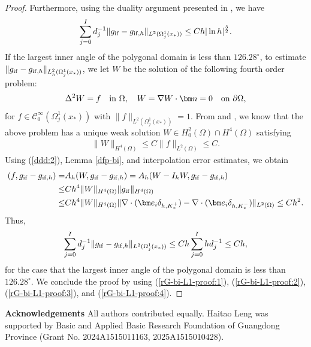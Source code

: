 \documentclass[1996/10/24]{amsart}
\theoremstyle{definition}
\numberwithin{equation}{section}
\begin{document}
\begin{proof}
Furthermore, using the duality argument presented in \cite[Subsection 4.2]{l2021}, we have
\begin{align}
\sum_{j=0}^Id_j^{-1}\|g_{{\rm if}}-g_{{\rm if},h}\|_{L^2(\Omega_j^1(x_{\ast}))}\leq Ch|\ln h|^{\frac{3}{2}}.\label{rG-bi-L1-proof:3}
\end{align}
If the largest inner angle of the polygonal domain is less than $126.28^\circ$, to estimate $\|g_{{\rm if}}-g_{{\rm if},h}\|_{L^2_h(\Omega_j^1(x_{\ast}))}$, we
let $W$ be the solution of the following fourth order problem:
\begin{align*}
\Delta^2 W=f\quad {\rm in}~\Omega,\quad W=\nabla W\cdot{\bm n}=0\quad {\rm on}~\partial\Omega,
\end{align*}
for $f\in\mathcal{C}_0^{\infty}(\Omega_j^1(x_{\ast}))$ with $\|f\|_{L^2(\Omega_j^1(x_{\ast}))}=1$. From \cite[Theorem 2]{br1980} and \cite[(7)]{hltwz2026}, we know that
the above problem has a unique weak solution $W\in H_0^2(\Omega)\cap H^4(\Omega)$ satisfying
\begin{align*}
\|W\|_{H^4(\Omega)}\leq C\|f\|_{L^2(\Omega)}\leq C.
\end{align*}
Using (\ref{ddd:2}), Lemma \ref{dfp-bi}, and interpolation error estimates, we obtain
\begin{align*}
(f,g_{{\rm if}}-g_{{\rm if},h})=&A_h(W,g_{{\rm if}}-g_{{\rm if},h})=A_h(W-I_hW,g_{{\rm if}}-g_{{\rm if},h})\\
\leq&Ch^4\|W\|_{H^4(\Omega)}\|g_{{\rm if}}\|_{H^4(\Omega)}\\
\leq& Ch^4\|W\|_{H^4(\Omega)}\|\nabla\cdot({\bm e}_i\delta_{h,K_{\ast}^+})-\nabla\cdot({\bm e}_i\delta_{h,K^-_{\ast}})\|_{L^2(\Omega)}\leq Ch^2.
\end{align*}
Thus,
\begin{align}
\sum_{j=0}^Id_j^{-1}\|g_{{\rm if}}-g_{{\rm if},h}\|_{L^2(\Omega_j^1(x_{\ast}))}\leq Ch\sum_{j=0}^Ihd_j^{-1}\leq Ch,\label{rG-bi-L1-proof:4}
\end{align}
for the case that the largest inner angle of the polygonal domain is less than $126.28^\circ$.
We conclude the proof by using (\ref{rG-bi-L1-proof:1}), (\ref{rG-bi-L1-proof:2}), (\ref{rG-bi-L1-proof:3}), and (\ref{rG-bi-L1-proof:4}).
\end{proof}

{\bf Acknowledgements}  All authors contributed equally. Haitao Leng was supported by Basic and
Applied Basic Research Foundation of Guangdong Province (Grant No. 2024A1515011163, 2025A1515010428).

\end{document}
